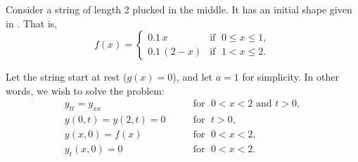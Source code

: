 \begin{example} \label{example:pluckedstring}
Consider a string of length 2 plucked in the middle.
It has an initial shape given in .
That is,
\begin{equation*}
f(x) = \begin{cases}
0.1\, x & \text{if } \; 0 \leq x \leq 1 , \\
0.1\, (2-x) & \text{if } \; 1 < x \leq 2 .
\end{cases}
\end{equation*}

\begin{myfig}
\capstart
{}
\caption{Initial shape of a plucked string from
.\label{wave:pluckedstrfig}}
\end{myfig}

Let the string start at rest ($g(x) =
0$), and let $a=1$ for simplicity.  In other words, we wish to
solve the problem:
\begin{equation*}
\begin{array}{ll}
y_{tt} = y_{xx} & \qquad \text{for } \; 0 < x < 2 \text{ and } t > 0, \\
y(0,t) = y(2,t)= 0 & \qquad \text{for } \; t > 0 , \\
y(x,0) = f(x) & \qquad \text{for } \; 0 < x < 2 , \\
y_t(x,0)= 0 & \qquad \text{for } \; 0 < x < 2.
\end{array}
\end{equation*}


\end{example}
